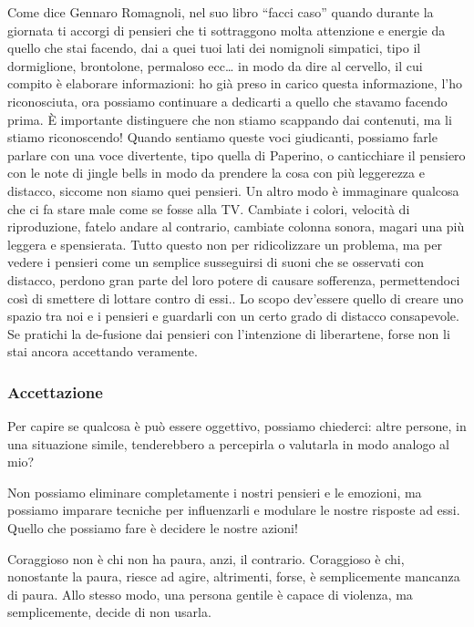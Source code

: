 \documentclass[12pt]{book} %
\begin{document}
Come dice Gennaro Romagnoli, nel suo libro “facci caso” quando durante la giornata ti accorgi di pensieri che ti sottraggono
molta attenzione e energie da quello che stai facendo, dai a quei tuoi lati dei nomignoli simpatici, tipo il
dormiglione, brontolone, permaloso ecc… in modo da dire al
cervello, il cui compito è elaborare informazioni: ho già preso in carico questa informazione, l'ho riconosciuta, ora
possiamo continuare a dedicarti a quello che stavamo facendo prima. È importante distinguere che non stiamo scappando
dai contenuti, ma li stiamo riconoscendo! Quando sentiamo queste voci giudicanti, possiamo farle parlare con una voce
divertente, tipo quella di Paperino, o canticchiare il pensiero con le note di jingle bells in modo da prendere la cosa
con più leggerezza e distacco, siccome non siamo quei pensieri. Un altro modo è immaginare qualcosa che ci fa stare
male come se fosse alla TV. Cambiate i colori, velocità di riproduzione, fatelo andare al contrario, cambiate colonna
sonora, magari una più leggera e spensierata. Tutto questo non per ridicolizzare un problema, ma per vedere i pensieri
come un semplice susseguirsi di suoni che se osservati con distacco, perdono gran parte del loro potere di causare sofferenza, permettendoci così di smettere di lottare contro di essi.. Lo scopo
dev'essere quello di creare uno spazio tra noi e i pensieri e guardarli con un certo grado di
distacco consapevole. Se pratichi la de-fusione dai pensieri con l'intenzione di liberartene, forse non li stai ancora accettando veramente.

\subsubsection{Accettazione}
Per capire se qualcosa è può essere oggettivo, possiamo chiederci: altre persone, in una situazione simile, tenderebbero a percepirla o valutarla in modo analogo al mio?

Non possiamo eliminare completamente i nostri pensieri e le emozioni, ma possiamo imparare tecniche per influenzarli e modulare le nostre risposte ad essi. Quello che possiamo fare è decidere le nostre azioni!

Coraggioso non è chi non ha paura, anzi, il contrario. Coraggioso è chi, nonostante la paura, riesce ad agire, altrimenti, forse, è semplicemente mancanza di paura.
Allo stesso modo, una persona gentile è capace di violenza, ma semplicemente, decide di non usarla.
\end{document}
